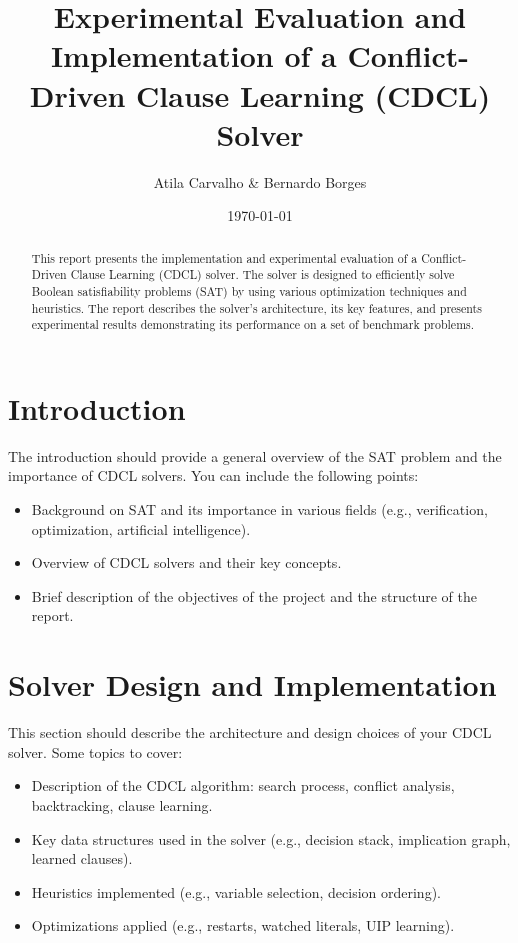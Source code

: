 \documentclass[a4paper,12pt]{article}
\title{Experimental Evaluation and Implementation of a Conflict-Driven Clause Learning (CDCL) Solver}
\author{Atila Carvalho \& Bernardo Borges}
\date{\today}
\begin{document}
\maketitle

\begin{abstract}
    This report presents the implementation and experimental evaluation of a Conflict-Driven Clause Learning (CDCL) solver. The solver is designed to efficiently solve Boolean satisfiability problems (SAT) by using various optimization techniques and heuristics. The report describes the solver’s architecture, its key features, and presents experimental results demonstrating its performance on a set of benchmark problems.
\end{abstract}

\tableofcontents
\newpage

\section{Introduction}
\label{sec:introduction}
The introduction should provide a general overview of the SAT problem and the importance of CDCL solvers. You can include the following points:
\begin{itemize}
    \item Background on SAT and its importance in various fields (e.g., verification, optimization, artificial intelligence).
    \item Overview of CDCL solvers and their key concepts.
    \item Brief description of the objectives of the project and the structure of the report.
\end{itemize}

\section{Solver Design and Implementation}
\label{sec:design}
This section should describe the architecture and design choices of your CDCL solver. Some topics to cover:
\begin{itemize}
    \item Description of the CDCL algorithm: search process, conflict analysis, backtracking, clause learning.
    \item Key data structures used in the solver (e.g., decision stack, implication graph, learned clauses).
    \item Heuristics implemented (e.g., variable selection, decision ordering).
    \item Optimizations applied (e.g., restarts, watched literals, UIP learning).
\end{itemize}
\end{document}
